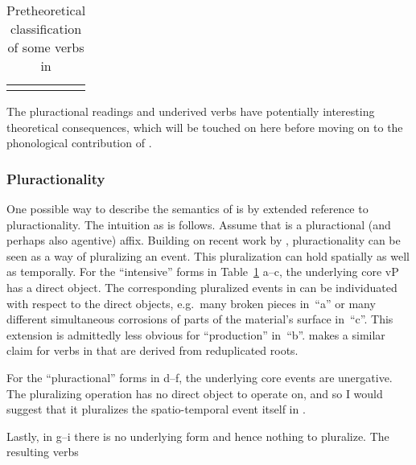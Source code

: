 \begin{exe}
\begin{xlist}
\begin{exe}
\begin{xlist}
\begin{exe}
\begin{xlist}
\begin{exe}
\begin{exe}
\begin{xlist}
\begin{exe}
\begin{xlist}
\begin{exe}
\begin{xlist}
\begin{exe}
\begin{xlist}
\begin{exe}
\begin{xlist}
\begin{exe}
\begin{xlist}
\begin{exe}
\begin{xlist}
\begin{exe}
\begin{xlist}
\begin{exe}
\begin{xlist}
\begin{exe}
\begin{xlist}
\begin{exe}
\begin{xlist}
\begin{exe}
\begin{xlist}
\begin{exe}
\begin{xlist}
\begin{exe}
\begin{exe}
\begin{xlist}
\begin{exe}
\begin{xlist}
\begin{exe}
\begin{xlist}
\begin{exe}
\begin{xlist}
\begin{exe}
\begin{xlist}
\begin{exe}
\begin{xlist}
\begin{exe}
\begin{xlist}
\begin{exe}
\begin{xlist}
\begin{xlist}
\begin{xlist}
\begin{exe}
\begin{xlist}
\begin{xlist}
\begin{xlist}
\begin{exe}
\begin{exe}
\begin{xlist}
\begin{exe}
\begin{xlist}
\begin{exe}
\begin{xlist}
\begin{exe}
\begin{xlist}
\begin{exe}
\begin{xlist}
\begin{exe}
\begin{xlist}
\begin{exe}
\begin{xlist}
\begin{exe}
\begin{exe}
\begin{xlist}
\begin{xlist}
\begin{exe}
\begin{xlist}
\begin{exe}
\begin{xlist}
\begin{exe}
\begin{xlist}
\begin{exe}
\begin{xlist}
\begin{exe}
\begin{xlist}
\begin{exe}
\begin{xlist}
\begin{exe}
\begin{exe}
\begin{xlist}
\begin{exe}
\begin{xlist}
\begin{exe}
\begin{xlist}
\begin{exe}
\begin{xlist}
\begin{table}
\begin{tabular}{llllll}
		\lspbottomrule
	\end{tabular}
	\caption{Pretheoretical classification of some verbs in {\tpie}\label{table:voice:piel-meanings2}}
\end{table}

The pluractional readings and underived verbs have potentially interesting theoretical consequences, which will be touched on here before moving on to the phonological contribution of {\va}.

		\subsubsection{Pluractionality} \label{voice:va:sem:plural}
One possible way to describe the semantics of {\va} is by extended reference to pluractionality. The intuition as is follows. Assume that {\va} is a pluractional (and perhaps also agentive) affix. Building on recent work by \cite{henderson12phd,henderson17nllt}, pluractionality can be seen as a way of pluralizing an event. This pluralization can hold spatially as well as temporally. For the ``intensive'' forms in Table~\ref{table:voice:piel-meanings2} a--c, the underlying core vP has a direct object. The corresponding pluralized events in {\tpie} can be individuated with respect to the direct objects, e.g.~many broken pieces in~``a'' or many different simultaneous corrosions of parts of the material's surface in~``c''. This extension is admittedly less obvious for ``production'' in~``b''. \cite{greenberg10} makes a similar claim for verbs in {\tpie} that are derived from reduplicated roots.

For the ``pluractional'' forms in d--f, the underlying core events are unergative. The pluralizing operation has no direct object to operate on, and so I would suggest that it pluralizes the spatio-temporal event itself in {\tpie}.

Lastly, in g--i there is no underlying form and hence nothing to pluralize. The resulting verbs 
\end{xlist}
\end{exe}
\end{xlist}
\end{exe}
\end{xlist}
\end{exe}
\end{xlist}
\end{exe}
\end{exe}
\end{xlist}
\end{exe}
\end{xlist}
\end{exe}
\end{xlist}
\end{exe}
\end{xlist}
\end{exe}
\end{xlist}
\end{exe}
\end{xlist}
\end{exe}
\end{xlist}
\end{xlist}
\end{exe}
\end{exe}
\end{xlist}
\end{exe}
\end{xlist}
\end{exe}
\end{xlist}
\end{exe}
\end{xlist}
\end{exe}
\end{xlist}
\end{exe}
\end{xlist}
\end{exe}
\end{xlist}
\end{exe}
\end{exe}
\end{xlist}
\end{xlist}
\end{xlist}
\end{exe}
\end{xlist}
\end{xlist}
\end{xlist}
\end{exe}
\end{xlist}
\end{exe}
\end{xlist}
\end{exe}
\end{xlist}
\end{exe}
\end{xlist}
\end{exe}
\end{xlist}
\end{exe}
\end{xlist}
\end{exe}
\end{xlist}
\end{exe}
\end{exe}
\end{xlist}
\end{exe}
\end{xlist}
\end{exe}
\end{xlist}
\end{exe}
\end{xlist}
\end{exe}
\end{xlist}
\end{exe}
\end{xlist}
\end{exe}
\end{xlist}
\end{exe}
\end{xlist}
\end{exe}
\end{xlist}
\end{exe}
\end{xlist}
\end{exe}
\end{xlist}
\end{exe}
\end{xlist}
\end{exe}
\end{xlist}
\end{exe}
\end{exe}
\end{xlist}
\end{exe}
\end{xlist}
\end{exe}
\end{xlist}
\end{exe}
